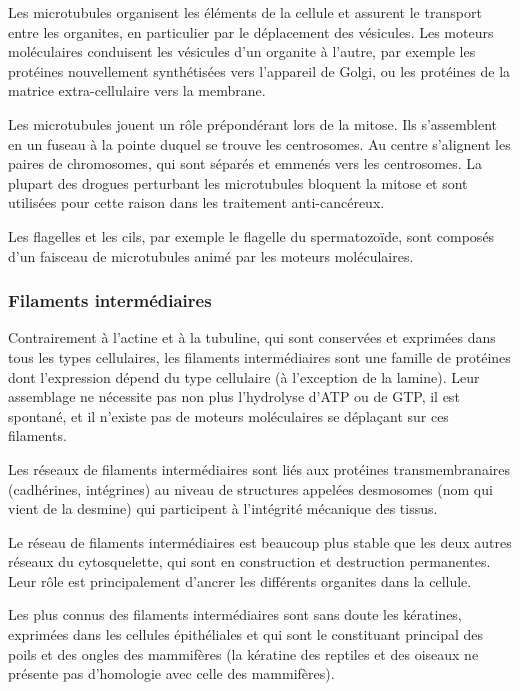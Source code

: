 \documentclass{report}
\begin{document}
Les microtubules organisent les éléments de la cellule et assurent le transport entre les organites, en particulier par le déplacement des vésicules. Les moteurs moléculaires conduisent les vésicules d'un organite à l'autre, par exemple les protéines nouvellement synthétisées vers l'appareil de Golgi, ou les protéines de la matrice extra-cellulaire vers la membrane. 

Les microtubules jouent un rôle prépondérant lors de la mitose. Ils s'assemblent en un fuseau à la pointe duquel se trouve les centrosomes. Au centre s'alignent les paires de chromosomes, qui sont séparés et emmenés vers les centrosomes. La plupart des drogues perturbant les microtubules bloquent la mitose et sont utilisées pour cette raison dans les traitement anti-cancéreux. 

Les flagelles et les cils, par exemple le flagelle du spermatozoïde, sont composés d'un faisceau de microtubules animé par les moteurs moléculaires. 

\subsubsection{Filaments intermédiaires}

Contrairement à l'actine et à la tubuline, qui sont conservées et exprimées dans tous les types cellulaires, les filaments intermédiaires sont une famille de protéines dont l'expression dépend du type cellulaire (à l'exception de la lamine). 
Leur assemblage ne nécessite pas non plus l'hydrolyse d'ATP ou de GTP, il est spontané, et il n'existe pas de moteurs moléculaires se déplaçant sur ces filaments. 

Les réseaux de filaments intermédiaires sont liés aux protéines transmembranaires (cadhérines, intégrines) au niveau de structures appelées desmosomes (nom qui vient de la desmine) qui participent à l'intégrité mécanique des tissus. 

Le réseau de filaments intermédiaires est beaucoup plus stable que les deux autres réseaux du cytosquelette, qui sont en construction et destruction permanentes. Leur rôle est principalement d'ancrer les différents organites dans la cellule. 

Les plus connus des filaments intermédiaires sont sans doute les kératines, exprimées dans les cellules épithéliales et qui sont le constituant principal des poils et des ongles des mammifères (la kératine des reptiles et des oiseaux ne présente pas d'homologie avec celle des mammifères). 
\end{document}
